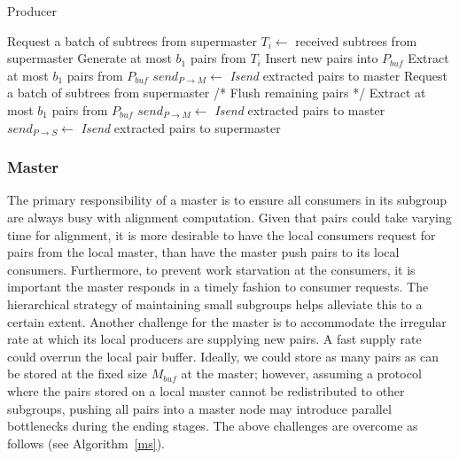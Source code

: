 \documentclass[10pt,journal,letterpaper,compsoc]{IEEEtran}
\begin{document}
\begin{algorithm}
\caption{Producer}
\label{pd}
\begin{algorithmic}[1]
    \STATE Request a batch of subtrees from supermaster
    \WHILE{\TRUE}
        \STATE $T_i \leftarrow$ received subtrees from supermaster 
        \ELSE
        	\REPEAT
                		\STATE Generate at most $b_1$ pairs from $T_i$
                		\STATE Insert new pairs into $P_{buf}$
            		\ENDIF
                	\STATE Extract at most $b_1$ pairs from $P_{buf}$
                	\STATE $send_{P\rightarrow M}\leftarrow$ {\it Isend} extracted pairs to master
            	\ENDIF
        	\STATE Request a batch of subtrees from supermaster
	\ENDIF
    \ENDWHILE
    \STATE /* Flush remaining pairs */
        \STATE Extract at most $b_1$ pairs from $P_{buf}$
            \STATE $send_{P\rightarrow M}\leftarrow$ {\it Isend} extracted pairs to master
        \ENDIF
            \STATE $send_{P\rightarrow S}\leftarrow$ {\it Isend} extracted pairs to supermaster
        \ENDIF
    \ENDWHILE
\end{algorithmic}
\end{algorithm}


\subsubsection{Master}
\label{secMaster}

The primary responsibility of a master is to ensure all consumers in its subgroup are always busy with alignment computation. Given that pairs could take varying time for alignment, it is more desirable to have the local consumers request for pairs from the local master, than have the master push pairs to its local consumers. Furthermore, to prevent work starvation at the consumers, it is important the master responds in a timely fashion to consumer requests. The hierarchical strategy of maintaining small subgroups helps alleviate this to a certain extent. Another challenge for the master is to accommodate the irregular rate at which its local producers are supplying new pairs. A fast supply rate could overrun the local pair buffer. Ideally, we could store as many pairs as can be stored at the fixed size $M_{buf}$ at the master; however, assuming a protocol where the pairs stored on a local master cannot be redistributed to other subgroups, pushing all pairs into a master node may introduce parallel bottlenecks during the ending stages. The above challenges are overcome as follows (see Algorithm~\ref{ms}). 
\end{document}
